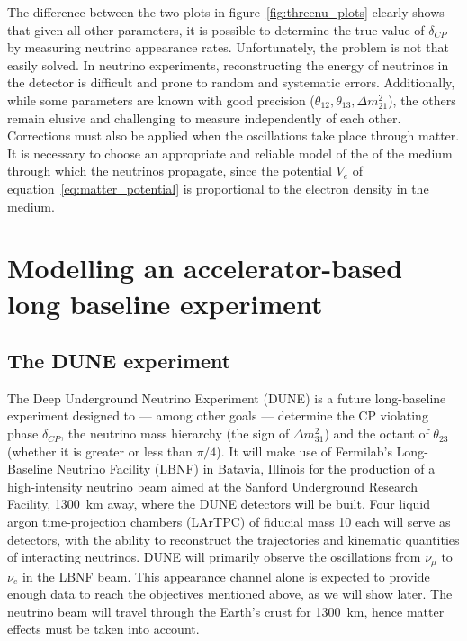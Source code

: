 The difference between the two plots in figure~\ref{fig:threenu_plots} clearly
shows that given all other parameters, it is possible to determine the true
value of $\delta_{CP}$ by measuring neutrino appearance rates. Unfortunately,
the problem is not that easily solved. In neutrino experiments, reconstructing
the energy of neutrinos in the detector is difficult and prone to random and
systematic errors. Additionally, while some parameters are known with good
precision ($\theta_{12}, \theta_{13}, \Delta m^2_{21}$), the others remain
elusive and challenging to measure independently of each other.
Corrections must also be applied when the oscillations take place
through matter. It is necessary to choose an appropriate and reliable model of the
of the medium through which the neutrinos propagate, since the potential $V_e$ of
equation~\ref{eq:matter_potential} is proportional to the electron density in
the medium.


\section{Modelling an accelerator-based long baseline experiment}

\subsection{The DUNE experiment}
The Deep Underground Neutrino Experiment (DUNE) is a future long-baseline
experiment designed to --- among other goals --- determine the CP violating phase
$\delta_{CP}$, the neutrino mass hierarchy (the sign of $\Delta m^2_{31}$) and
the octant of $\theta_{23}$ (whether it is greater or less than 
$\pi/4$)\cite{cdr}. 
It will make use of Fermilab's Long-Baseline Neutrino Facility (LBNF) in Batavia,
Illinois for the production of a high-intensity neutrino beam aimed at the
Sanford Underground Research Facility, \SI{1300}{\km} away, where the DUNE
detectors will be built.
Four liquid argon time-projection chambers (LArTPC) of fiducial mass
\SI{10}{\kt} each will serve as detectors, with the ability to reconstruct the
trajectories and kinematic quantities of interacting neutrinos.
DUNE will primarily observe the oscillations from $\nu_\mu$ to $\nu_e$ in the
LBNF beam. This appearance channel alone is expected to provide enough data to
reach the objectives mentioned above, as we will show later.
The neutrino beam will travel through the Earth's crust for \SI{1300}{\km},
hence matter effects must be taken into account.

